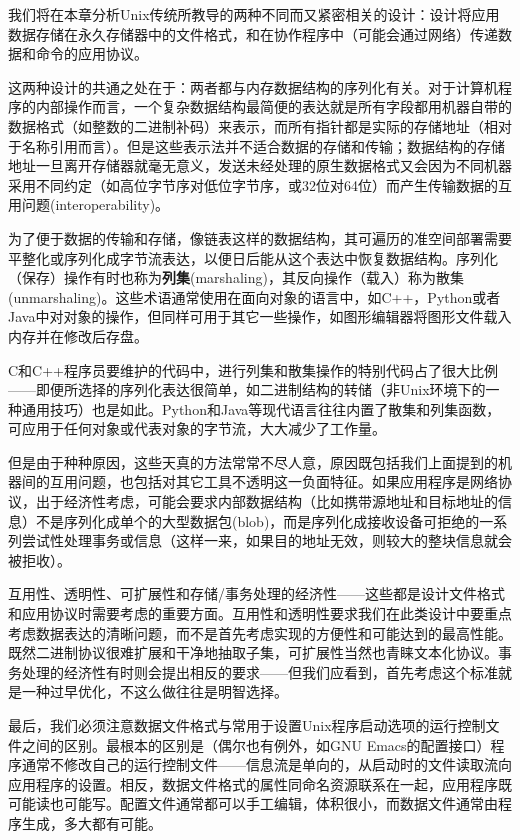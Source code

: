 \documentclass[12pt,oneside]{book}
\begin{document}
我们将在本章分析Unix传统所教导的两种不同而又紧密相关的设计：设计将应用数据存储在永久存储器中的文件格式，和在协作程序中（可能会通过网络）传递数据和命令的应用协议。

这两种设计的共通之处在于：两者都与内存数据结构的序列化有关。对于计算机程序的内部操作而言，一个复杂数据结构最简便的表达就是所有字段都用机器自带的数据格式（如整数的二进制补码）来表示，而所有指针都是实际的存储地址（相对于名称引用而言）。但是这些表示法并不适合数据的存储和传输；数据结构的存储地址一旦离开存储器就毫无意义，发送未经处理的原生数据格式又会因为不同机器采用不同约定（如高位字节序对低位字节序，或32位对64位）而产生传输数据的互用问题(interoperability)。

为了便于数据的传输和存储，像链表这样的数据结构，其可遍历的准空间部署需要平整化或序列化成字节流表达，以便日后能从这个表达中恢复数据结构。序列化（保存）操作有时也称为\textbf{列集}(marshaling)，其反向操作（载入）称为散集(unmarshaling)。这些术语通常使用在面向对象的语言中，如C++，Python或者Java中对对象的操作，但同样可用于其它一些操作，如图形编辑器将图形文件载入内存并在修改后存盘。

C和C++程序员要维护的代码中，进行列集和散集操作的特别代码占了很大比例——即便所选择的序列化表达很简单，如二进制结构的转储（非Unix环境下的一种通用技巧）也是如此。Python和Java等现代语言往往内置了散集和列集函数，可应用于任何对象或代表对象的字节流，大大减少了工作量。

但是由于种种原因，这些天真的方法常常不尽人意，原因既包括我们上面提到的机器间的互用问题，也包括对其它工具不透明这一负面特征。如果应用程序是网络协议，出于经济性考虑，可能会要求内部数据结构（比如携带源地址和目标地址的信息）不是序列化成单个的大型数据包(blob)，而是序列化成接收设备可拒绝的一系列尝试性处理事务或信息（这样一来，如果目的地址无效，则较大的整块信息就会被拒收）。

互用性、透明性、可扩展性和存储/事务处理的经济性——这些都是设计文件格式和应用协议时需要考虑的重要方面。互用性和透明性要求我们在此类设计中要重点考虑数据表达的清晰问题，而不是首先考虑实现的方便性和可能达到的最高性能。既然二进制协议很难扩展和干净地抽取子集，可扩展性当然也青睐文本化协议。事务处理的经济性有时则会提出相反的要求——但我们应看到，首先考虑这个标准就是一种过早优化，不这么做往往是明智选择。

最后，我们必须注意数据文件格式与常用于设置Unix程序启动选项的运行控制文件之间的区别。最根本的区别是（偶尔也有例外，如GNU Emacs的配置接口）程序通常不修改自己的运行控制文件——信息流是单向的，从启动时的文件读取流向应用程序的设置。相反，数据文件格式的属性同命名资源联系在一起，应用程序既可能读也可能写。配置文件通常都可以手工编辑，体积很小，而数据文件通常由程序生成，多大都有可能。
\end{document}

